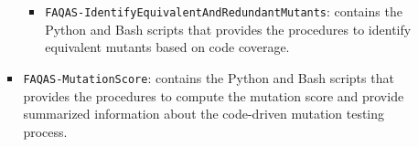 \begin{itemize}
\begin{itemize}
\begin{itemize}
\begin{itemize}
				\item \texttt{FAQAS-IdentifyEquivalentAndRedundantMutants}: contains the Python and Bash scripts that provides the procedures to identify equivalent mutants based on code coverage.
			\end{itemize}
			\item \texttt{FAQAS-MutationScore}: contains the Python and Bash scripts that provides the procedures to compute the mutation score and provide summarized information about the code-driven mutation testing process.
		\end{itemize}
	\end{itemize}
\end{itemize}

